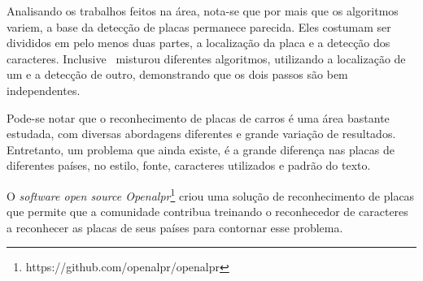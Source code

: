 Analisando os trabalhos feitos na área, nota-se que por mais que os algoritmos variem,
a base da detecção de placas permanece parecida. Eles costumam ser divididos em pelo 
menos duas partes, a localização da placa e a detecção dos caracteres. Inclusive~\cite{ahmad2015automatic}
misturou diferentes algoritmos, utilizando a localização de um e a detecção de
outro, demonstrando que os dois passos são bem independentes.

Pode-se notar que o reconhecimento de placas de carros é uma área bastante estudada,
com diversas abordagens diferentes e grande variação de resultados. Entretanto,
um problema que ainda existe, é a grande diferença nas placas de diferentes países,
no estilo, fonte, caracteres utilizados e padrão do texto.

O \emph{software open source Openalpr}\footnote{https://github.com/openalpr/openalpr}
criou uma solução de reconhecimento de placas que permite que a comunidade contribua
treinando o reconhecedor de caracteres a reconhecer as placas de seus países para contornar
esse problema.
